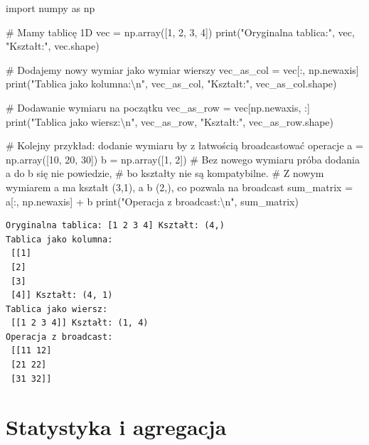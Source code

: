 \documentclass[
  polish,
  letterpaper,
  DIV=11,
  numbers=noendperiod]{scrreprt}
\newenvironment{Shaded}{\begin{snugshade}}{\end{snugshade}}
\newcommand{\BuiltInTok}[1]{\textcolor[rgb]{0.00,0.23,0.31}{#1}}
\newcommand{\CharTok}[1]{\textcolor[rgb]{0.13,0.47,0.30}{#1}}
\newcommand{\CommentTok}[1]{\textcolor[rgb]{0.37,0.37,0.37}{#1}}
\newcommand{\DecValTok}[1]{\textcolor[rgb]{0.68,0.00,0.00}{#1}}
\newcommand{\ImportTok}[1]{\textcolor[rgb]{0.00,0.46,0.62}{#1}}
\newcommand{\NormalTok}[1]{\textcolor[rgb]{0.00,0.23,0.31}{#1}}
\newcommand{\OperatorTok}[1]{\textcolor[rgb]{0.37,0.37,0.37}{#1}}
\newcommand{\StringTok}[1]{\textcolor[rgb]{0.13,0.47,0.30}{#1}}
\begin{document}
\begin{Shaded}
\begin{Highlighting}[]
\ImportTok{import}\NormalTok{ numpy }\ImportTok{as}\NormalTok{ np}

\CommentTok{\# Mamy tablicę 1D}
\NormalTok{vec }\OperatorTok{=}\NormalTok{ np.array([}\DecValTok{1}\NormalTok{, }\DecValTok{2}\NormalTok{, }\DecValTok{3}\NormalTok{, }\DecValTok{4}\NormalTok{])}
\BuiltInTok{print}\NormalTok{(}\StringTok{"Oryginalna tablica:"}\NormalTok{, vec, }\StringTok{"Kształt:"}\NormalTok{, vec.shape)}

\CommentTok{\# Dodajemy nowy wymiar jako wymiar wierszy}
\NormalTok{vec\_as\_col }\OperatorTok{=}\NormalTok{ vec[:, np.newaxis]}
\BuiltInTok{print}\NormalTok{(}\StringTok{"Tablica jako kolumna:}\CharTok{\textbackslash{}n}\StringTok{"}\NormalTok{, vec\_as\_col, }\StringTok{"Kształt:"}\NormalTok{, vec\_as\_col.shape)}

\CommentTok{\# Dodawanie wymiaru na początku}
\NormalTok{vec\_as\_row }\OperatorTok{=}\NormalTok{ vec[np.newaxis, :]}
\BuiltInTok{print}\NormalTok{(}\StringTok{"Tablica jako wiersz:}\CharTok{\textbackslash{}n}\StringTok{"}\NormalTok{, vec\_as\_row, }\StringTok{"Kształt:"}\NormalTok{, vec\_as\_row.shape)}

\CommentTok{\# Kolejny przykład: dodanie wymiaru by z łatwością broadcastować operacje}
\NormalTok{a }\OperatorTok{=}\NormalTok{ np.array([}\DecValTok{10}\NormalTok{, }\DecValTok{20}\NormalTok{, }\DecValTok{30}\NormalTok{])}
\NormalTok{b }\OperatorTok{=}\NormalTok{ np.array([}\DecValTok{1}\NormalTok{, }\DecValTok{2}\NormalTok{])}
\CommentTok{\# Bez nowego wymiaru próba dodania a do b się nie powiedzie, }
\CommentTok{\# bo kształty nie są kompatybilne.}
\CommentTok{\# Z nowym wymiarem a ma kształt (3,1), a b (2,), co pozwala na broadcast}
\NormalTok{sum\_matrix }\OperatorTok{=}\NormalTok{ a[:, np.newaxis] }\OperatorTok{+}\NormalTok{ b}
\BuiltInTok{print}\NormalTok{(}\StringTok{"Operacja z broadcast:}\CharTok{\textbackslash{}n}\StringTok{"}\NormalTok{, sum\_matrix)}
\end{Highlighting}
\end{Shaded}

\begin{verbatim}
Oryginalna tablica: [1 2 3 4] Kształt: (4,)
Tablica jako kolumna:
 [[1]
 [2]
 [3]
 [4]] Kształt: (4, 1)
Tablica jako wiersz:
 [[1 2 3 4]] Kształt: (1, 4)
Operacja z broadcast:
 [[11 12]
 [21 22]
 [31 32]]
\end{verbatim}

\section{Statystyka i agregacja}\label{statystyka-i-agregacja}
\end{document}
